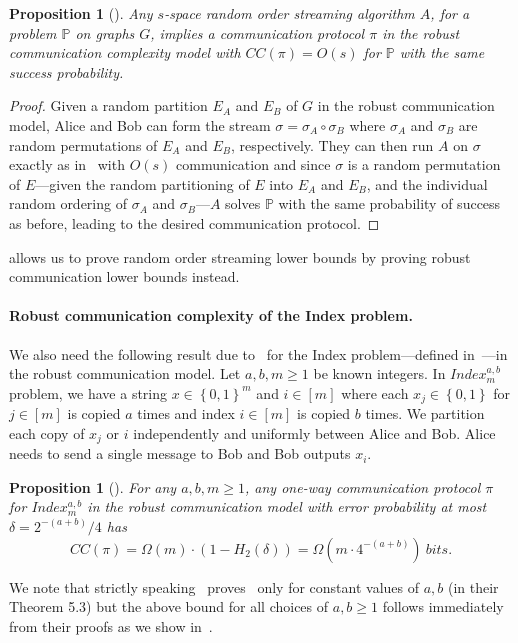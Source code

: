 \documentclass[11pt]{article}
\newtheorem{proposition}[lemma]{Proposition}
\theoremstyle{definition}
\renewcommand{\geq}{\geqslant}
\newcommand{\set}[1]{\ensuremath{\left\{ #1 \right\}}}
\newcommand{\prot}{\ensuremath{\pi}}
\begin{document}
\begin{proposition}[\!\!\cite{ChakrabartiCM08}]\label{prop:robust-stream-cc}
	Any $s$-space random order streaming algorithm $A$, for a problem $\mathbb{P}$ on graphs $G$, implies a communication
	protocol $\pi$ in the robust communication complexity model with $CC(\pi) = O(s)$ for $\mathbb{P}$ with the same success probability. 
\end{proposition}
\begin{proof}
	Given a random partition $E_A$ and $E_B$ of $G$ in the robust communication model, Alice and Bob can form the stream $\sigma = \sigma_A \circ \sigma_B$ where $\sigma_A$ and $\sigma_B$ are random permutations of 
	$E_A$ and $E_B$, respectively. They can then run $A$ on $\sigma$ exactly as in~ with $O(s)$ communication and since $\sigma$ is a random permutation of $E$---given the random partitioning of $E$ into $E_A$ and $E_B$, and 
	the individual random ordering of $\sigma_A$ and $\sigma_B$---$A$ solves $\mathbb{P}$ with the same probability of success as before, leading to the desired communication protocol. 
\end{proof}

 allows us to prove random order streaming lower bounds by proving robust communication lower bounds instead. 

\paragraph{Robust communication complexity of the Index problem.} We also need the following result due to~\cite{ChakrabartiCM08} for the Index problem---defined in~---in the robust communication model. 
Let $a,b,m \geq 1$ be known integers. In $Index^{a,b}_m$ problem, we have a string $x \in \set{0,1}^m$ and $i \in [m]$ where each $x_j \in \set{0,1}$ for $j \in [m]$ is copied $a$ times and index $i \in [m]$ is copied $b$ times. 
We partition each copy of $x_j$ or $i$ independently and uniformly between Alice and Bob. Alice needs to send a single message to Bob and Bob outputs $x_i$. 

\begin{proposition}[\!\!\cite{ChakrabartiCM08}]\label{prop:robust-index}
	For any $a,b,m \geq 1$, any one-way communication protocol $\prot$ for $Index^{a,b}_m$ in the robust communication model with error probability at most $\delta = 2^{-(a+b)}/4$ has
	\[
		CC(\pi) = \Omega(m) \cdot (1-H_2(\delta)) = \Omega(m \cdot 4^{-(a+b)})~bits. 
	\]
\end{proposition}
We note that strictly speaking~\cite{ChakrabartiCM08} proves~ only for constant values of $a,b$ (in their Theorem 5.3) but the above bound for all choices of $a,b \geq 1$ follows immediately from their proofs as 
we show in~. 
\end{document}
